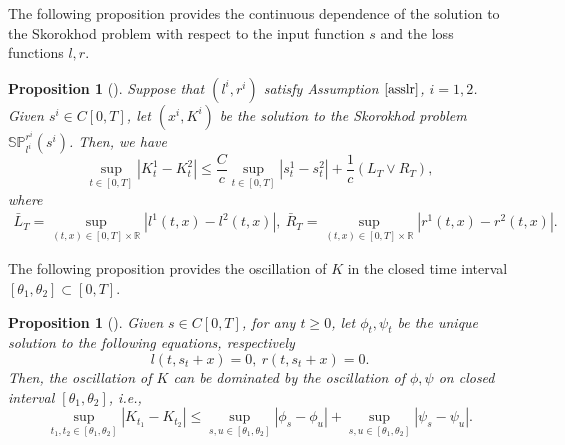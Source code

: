 \documentclass[10pt]{article}%
\numberwithin{equation}{section}
\newtheorem{proposition}[theorem]{Proposition}
\newtheorem{remark}[theorem]{Remark}
\begin{document}

The following proposition provides the continuous dependence of the solution to the Skorokhod problem with respect to the input function $s$ and the loss functions $l,r$.
\begin{proposition}[\cite{Li}]\label{continuity}
Suppose that $(l^i,r^i)$ satisfy Assumption $\ref{asslr}$, $i=1,2$.
Given  $s^i\in C[0,T]$, let $(x^i,K^i)$ be the solution to the Skorokhod problem $\mathbb{SP}_{l^i}^{r^i}(s^i)$. Then, we have
\begin{equation}\label{diffk}
\sup_{t\in[0,T]}\left|K^1_t-K^2_t\right|
\leq \frac{C}{c}\sup_{t\in[0,T]}\left|s^1_t-s^2_t\right|+\frac{1}{c}(L_T\vee R_T),
\end{equation}
where
\begin{align*}
\bar{L}_T=\sup_{(t,x)\in[0,T]\times \mathbb{R}}\left|{l}^1(t,x)-{l}^2(t,x)\right|,\
\bar{R}_T=\sup_{(t,x)\in[0,T]\times \mathbb{R}}\left|{r}^1(t,x)-{r}^2(t,x)\right|.
\end{align*}
\end{proposition}

The following proposition provides the oscillation of $K$ in the closed  time interval $[\theta_1,\theta_2]\subset [0,T]$.
\begin{proposition}[\cite{Li}]\label{oscillation}
Given $s\in C[0,T]$, for any $t\geq 0 $, let $\phi_t,\psi_t$ be the unique solution to the following equations, respectively 
$$l(t,s_t+x)=0,\ r(t,s_t+x)=0.$$
 Then, the oscillation of $K$ can be dominated by the oscillation of $\phi, \psi$ on closed interval $[\theta_1,\theta_2]$, i.e.,
$$\sup_{t_1,t_2\in[\theta_1,\theta_2]}\left|K_{t_1}-K_{t_2}\right|\leq \sup_{s,u\in[\theta_1,\theta_2]}\left|\phi_{s}-\phi_{u}\right|+\sup_{s,u\in[\theta_1,\theta_2]}\left|\psi_{s}-\psi_{u}\right|. $$
\end{proposition}
\end{document}
